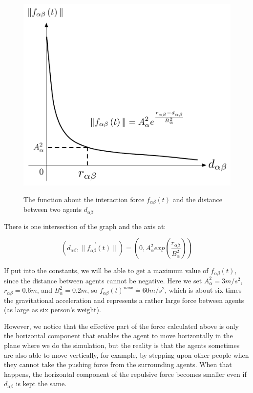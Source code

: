 \begin{figure}
    \centering
    {\includegraphics[scale=0.45]{Figures/physicalinteraction.pdf}} 
    \caption{The function about the interaction force 
        $f_{\alpha\beta}(t)$ and the distance between two agents
        $d_{\alpha \beta}$ }
    \label{physicalinteraction}
\end{figure}

There is one intersection of the graph and the  axis at:

\begin{equation}
	\left( d_{\alpha \beta} , \| \vec{f_{\alpha \beta}} \left( t \right) \| \right)
 =
	\left( 0 , A_{\alpha}^{2} exp\left( \frac{r_{\alpha\beta} }{B_{\alpha}^{2}}\right)  \right) 
\end{equation}

If put into the constants, we will be able to get a maximum value of $ f_{\alpha\beta}(t) $, 
since the distance between agents cannot be negative. Here we set $ A_{\alpha}^{2} = 3 m/s^{2} $, 
$ r_{\alpha\beta} = 0.6 m $, and $ B_{\alpha}^{2} = 0.2 m $, so 
$ f_{\alpha\beta}(t)^{max} \doteq 60 m/s^{2} $, which is about six times the gravitational 
acceleration and represents a rather large force between agents (as large as six person's weight).

However, we notice that the effective part of the force calculated above is only the horizontal 
component that enables the agent to move horizontally in the plane where we do the simulation, 
but the reality is that the agents sometimes are also able to move vertically, for example, 
by stepping upon other people when they cannot take the pushing force from the surrounding agents. 
When that happens, the horizontal component of the repulsive force becomes smaller even if $ d_{\alpha\beta} $ 
is kept the same.	

